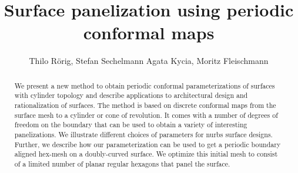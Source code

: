 \documentclass[twoside]{article}
\newcommand{\nurbs}{{\sc nurbs}\xspace}
\def\subfilebibliography {
	
}
\begin{document}
\def\subfilebibliography{}
\title{Surface panelization using periodic conformal maps}
\def\shortauthor{T.~R\"orig, S.~Sechelmann, A.~Kycia, M.~Fleischmann}
\def\shorttitle{Periodic conformal maps}
\author{Thilo R\"orig, Stefan Sechelmann
Agata Kycia, Moritz Fleischmann
}
\maketitle

\begin{abstract}
  We present a new method to obtain periodic conformal parameterizations of
  surfaces with cylinder topology and describe applications to
  architectural design and rationalization of surfaces. The method is
  based on discrete conformal maps from the surface mesh to a cylinder or
  cone of revolution. It comes with a number of degrees of freedom on
  the boundary that can be used to obtain a variety of interesting
  panelizations. We illustrate different choices of parameters for
  \nurbs surface designs. Further, we describe how our parameterization
  can be used to get a periodic boundary aligned hex-mesh on a
  doubly-curved surface. We optimize this initial mesh to consist of a
  limited number of planar regular hexagons that panel the surface.
\end{abstract}
\end{document}
